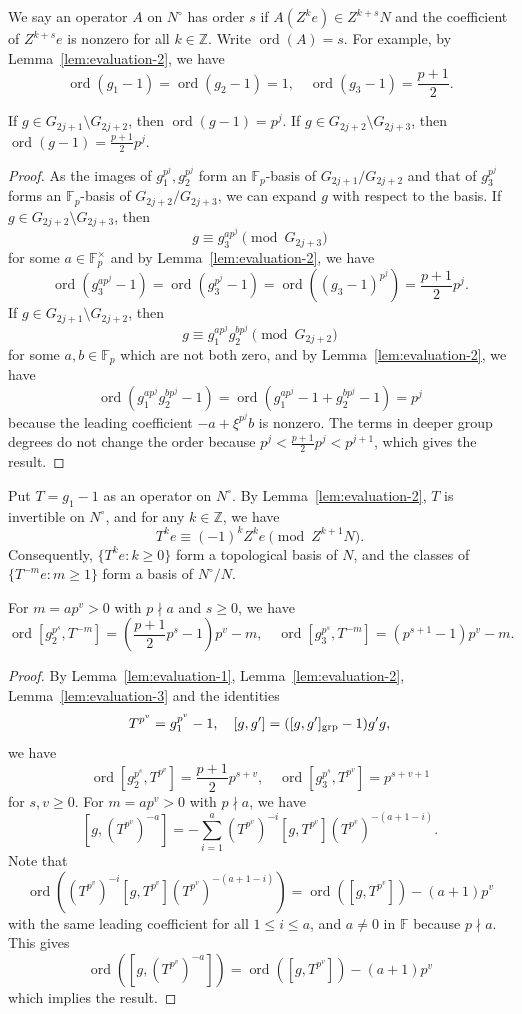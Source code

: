 \documentclass[11pt,a4paper]{article} %
\def\FF{\mathbb{F}}
\def\ZZ{\mathbb{Z}}
\def\ord{\operatorname{ord}}
\begin{document}
We say an operator $A$ on $N^\circ$ has order $s$ if $A(Z^ke)\in Z^{k+s}N$ and the coefficient of $Z^{k+s}e$ is nonzero for all $k\in\ZZ$. Write $\ord(A)=s$. For example, by Lemma~\ref{lem:evaluation-2}, we have
\[
\ord(g_1-1)=\ord(g_2-1)=1,\quad\ord(g_3-1)=\frac{p+1}{2}.
\]

\begin{lemma}\label{lem:evaluation-3}
    If $g\in G_{2j+1}\setminus G_{2j+2}$, then $\ord(g-1)=p^j$. If $g\in G_{2j+2}\setminus G_{2j+3}$, then $\ord(g-1)=\frac{p+1}{2} p^j$.
\end{lemma}

\begin{proof}
    As the images of $g_1^{p^j},g_2^{p^j}$ form an $\FF_p$-basis of $G_{2j+1}/G_{2j+2}$ and that of $g_3^{p^j}$ forms an $\FF_p$-basis of $G_{2j+2}/G_{2j+3}$, we can expand $g$ with respect to the basis. If $g\in G_{2j+2}\setminus G_{2j+3}$, then 
    \[
    g\equiv g_3^{ap^j}\pmod{G_{2j+3}}
    \]
    for some $a\in\FF_p^{\times}$ and by Lemma~\ref{lem:evaluation-2}, we have
    \[
    \ord(g_3^{ap^j}-1)=\ord(g_3^{p^j}-1)=\ord\left((g_3-1)^{p^j}\right)=\frac{p+1}{2} p^j.
    \]
    If $g\in G_{2j+1}\setminus G_{2j+2}$, then 
    \[
    g\equiv g_1^{ap^j}g_2^{bp^j}\pmod{G_{2j+2}}
    \]
    for some $a,b\in\FF_p$ which are not both zero, and by Lemma~\ref{lem:evaluation-2}, we have
    \[
    \ord(g_1^{ap^j}g_2^{bp^j}-1)=\ord(g_1^{ap^j}-1+g_2^{bp^j}-1)=p^j
    \]
    because the leading coefficient $-a+\xi^{p^j}b$ is nonzero. The terms in deeper group degrees do not change the order because $p^j<\frac{p+1}{2}p^j<p^{j+1}$, which gives the result. 
\end{proof}

Put $T=g_1-1$ as an operator on $N^\circ$. By Lemma~\ref{lem:evaluation-2}, $T$ is invertible on $N^\circ$, and for any $k\in\ZZ$, we have
\[
T^ke\equiv(-1)^kZ^ke\pmod{Z^{k+1}N}.
\]
Consequently, $\{T^ke:k\ge0\}$ form a topological basis of $N$, and the classes of $\{T^{-m}e:m\ge1\}$ form a basis of $N^\circ/N$.

\begin{lemma}\label{lem:evaluation-4}
    For $m=ap^v>0$ with $p\nmid a$ and $s\ge0$, we have
    \[
    \ord[g_2^{p^s},T^{-m}]=(\frac{p+1}{2}p^s-1)p^v-m,\quad
    \ord[g_3^{p^s},T^{-m}]=(p^{s+1}-1)p^v-m.
    \]
\end{lemma}

\begin{proof}
    By Lemma~\ref{lem:evaluation-1}, Lemma~\ref{lem:evaluation-2}, Lemma~\ref{lem:evaluation-3} and the identities
    \[
    T^{p^v}=g_1^{p^v}-1,\quad[g,g']=([g,g']_{\rm grp}-1)g'g,
    \]
    we have
    \[
    \ord[g_2^{p^s},T^{p^v}]=\frac{p+1}{2}p^{s+v},\quad
    \ord[g_3^{p^s},T^{p^v}]=p^{s+v+1}
    \]
    for $s,v\ge0$. For $m=ap^v>0$ with $p\nmid a$, we have
    \[
    [g,(T^{p^v})^{-a}]
    =-\sum_{i=1}^a(T^{p^v})^{-i}[g,T^{p^v}](T^{p^v})^{-(a+1-i)}.
    \]
    Note that
    \[
    \ord\left((T^{p^v})^{-i}[g,T^{p^v}](T^{p^v})^{-(a+1-i)}\right)=\ord([g,T^{p^v}])-(a+1)p^v
    \]
    with the same leading coefficient for all $1\le i\le a$, and $a\ne0$ in $\FF$ because $p\nmid a$. This gives 
    \[
    \ord( [g,(T^{p^v})^{-a}])=\ord([g,T^{p^v}])-(a+1)p^v
    \]
    which implies the result.
\end{proof}
\end{document}
